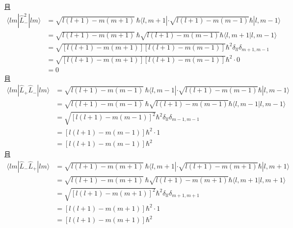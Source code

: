 且
\begin{equation}
    \begin{aligned}
        \langle lm|\hat{L}_{-}^{2}|lm\rangle &=\sqrt{l\left( l+1 \right) -m\left( m+1 \right)}\,\hbar \langle l,m+1|\cdot \sqrt{l\left( l+1 \right) -m\left( m-1 \right)}\hbar |l,m-1\rangle 
\\
&=\sqrt{l\left( l+1 \right) -m\left( m+1 \right)}\,\hbar \sqrt{l\left( l+1 \right) -m\left( m-1 \right)}\hbar \langle l,m+1|l,m-1\rangle 
\\
&=\sqrt{\left[ l\left( l+1 \right) -m\left( m+1 \right) \right] \left[ l\left( l+1 \right) -m\left( m-1 \right) \right]}\hbar ^2\delta _{ll}\delta _{m+1,m-1}
\\
&=\sqrt{\left[ l\left( l+1 \right) -m\left( m+1 \right) \right] \left[ l\left( l+1 \right) -m\left( m-1 \right) \right]}\hbar ^2\cdot 0
\\
&=0
    \end{aligned}
\end{equation}
且
\begin{equation}
    \begin{aligned}
        \langle lm|\hat{L}_+\hat{L}_-|lm\rangle &=\sqrt{l\left( l+1 \right) -m\left( m-1 \right)}\,\hbar \langle l,m-1|\cdot \sqrt{l\left( l+1 \right) -m\left( m-1 \right)}\hbar |l,m-1\rangle 
\\
&=\sqrt{l\left( l+1 \right) -m\left( m-1 \right)}\,\hbar \sqrt{l\left( l+1 \right) -m\left( m-1 \right)}\hbar \langle l,m-1|l,m-1\rangle 
\\
&=\sqrt{\left[ l\left( l+1 \right) -m\left( m-1 \right) \right] ^2}\hbar ^2\delta _{ll}\delta _{m-1,m-1}
\\
&=\left[ l\left( l+1 \right) -m\left( m-1 \right) \right] \hbar ^2\cdot 1
\\
&=\left[ l\left( l+1 \right) -m\left( m-1 \right) \right] \hbar ^2
    \end{aligned}
\end{equation}
且
\begin{equation}
    \begin{aligned}
        \langle lm|\hat{L}_-\hat{L}_+|lm\rangle &=\sqrt{l\left( l+1 \right) -m\left( m+1 \right)}\,\hbar \langle l,m+1|\cdot \sqrt{l\left( l+1 \right) -m\left( m+1 \right)}\hbar |l,m+1\rangle 
\\
&=\sqrt{l\left( l+1 \right) -m\left( m+1 \right)}\,\hbar \sqrt{l\left( l+1 \right) -m\left( m+1 \right)}\hbar \langle l,m+1|l,m+1\rangle 
\\
&=\sqrt{\left[ l\left( l+1 \right) -m\left( m+1 \right) \right] ^2}\hbar ^2\delta _{ll}\delta _{m+1,m+1}
\\
&=\left[ l\left( l+1 \right) -m\left( m+1 \right) \right] \hbar ^2\cdot 1
\\
&=\left[ l\left( l+1 \right) -m\left( m+1 \right) \right] \hbar ^2
    \end{aligned}
\end{equation}
